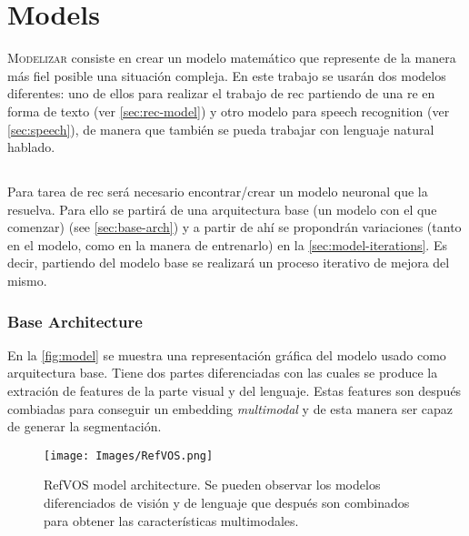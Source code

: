 

\chapter{Models}\label{cha:model}



\lettrine{M}{odelizar} consiste en crear un modelo matemático que represente de
la manera más fiel posible una situación compleja. En este trabajo se usarán
dos modelos diferentes: uno de ellos para realizar el trabajo de \gls{rec}
partiendo de una \gls{re} en forma de texto (ver \vref{sec:rec-model}) y otro
modelo para speech recognition (ver \vref{sec:speech}), de manera que también
se pueda trabajar con lenguaje natural hablado.


\section{}\label{sec:rec-model}

Para tarea de \gls{rec} será necesario encontrar/crear un modelo neuronal que
la resuelva. Para ello se partirá de una arquitectura base (un modelo con el
que comenzar) (see \vref{sec:base-arch}) y a partir de ahí se propondrán
variaciones (tanto en el modelo, como en la manera de entrenarlo) en la
\vref{sec:model-iterations}. Es decir, partiendo del modelo base se realizará
un proceso iterativo de mejora del mismo.

\subsection{Base Architecture}\label{sec:base-arch}

En la \vref{fig:model} se muestra una representación gráfica del modelo usado
como arquitectura base. Tiene dos partes diferenciadas con las cuales se
produce la extración de features de la parte visual y del lenguaje. Estas
features son después combiadas para conseguir un embedding \emph{multimodal} y
de esta manera ser capaz de generar la segmentación.

\begin{figure}[ht]
  \centering
  \texttt{[image: Images/RefVOS.png]}
  \caption[RefVOS model architecture]{RefVOS model architecture. Se pueden
    observar los modelos diferenciados de visión y de lenguaje que después son
    combinados para obtener las características multimodales.}\label{fig:model}
\end{figure}

